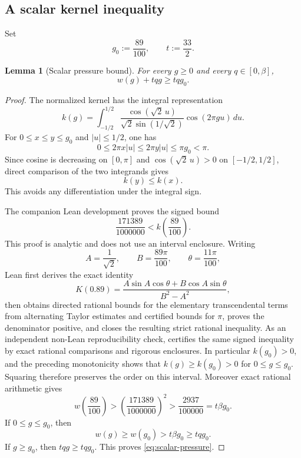 \documentclass[11pt]{article}
\newtheorem{lemma}[theorem]{Lemma}
\begin{document}
\subsection{A scalar kernel inequality}

Set
\begin{equation}\label{eq:g0t}
 g_0:=\frac{89}{100},
 \qquad
 t:=\frac{33}{2}.
\end{equation}

\begin{lemma}[Scalar pressure bound]\label{lem:scalar-pressure}
For every \(g\ge0\) and every \(q\in[0,\beta]\),
\begin{equation}\label{eq:scalar-pressure}
 w(g)+tqg\ge tqg_0.
\end{equation}
\end{lemma}

\begin{proof}
The normalized kernel has the integral representation
\[
 k(g)
 =
 \int_{-1/2}^{1/2}
 \frac{\cos(\sqrt2\,u)}
      {\sqrt2\sin(1/\sqrt2)}
 \cos(2\pi gu)\,du .
\]
For \(0\le x\le y\le g_0\) and \(|u|\le1/2\), one has
\[
 0\le2\pi x|u|\le2\pi y|u|\le\pi g_0<\pi.
\]
Since cosine is decreasing on \([0,\pi]\) and
\(\cos(\sqrt2\,u)>0\) on \([-1/2,1/2]\), direct comparison of the two
integrands gives
\[
 k(y)\le k(x).
\]
This avoids any differentiation under the integral sign.

The companion Lean development proves the signed
bound
\begin{equation}\label{eq:k089-signed}
 \frac{171389}{1000000}
 <
 k\!\left(\frac{89}{100}\right).
\end{equation}
This proof is analytic and does not use an interval enclosure.  Writing
\[
 A=\frac1{\sqrt2},\qquad B=\frac{89\pi}{100},\qquad
 \theta=\frac{11\pi}{100},
\]
Lean first derives the exact identity
\[
 K(0.89)=
 \frac{A\sin A\cos\theta+B\cos A\sin\theta}{B^2-A^2},
\]
then obtains directed rational bounds for the elementary transcendental terms
from alternating Taylor estimates and certified bounds for \(\pi\), proves the
denominator positive, and closes the resulting strict rational inequality.
As an independent non-Lean reproducibility check,
 certifies the same signed inequality by
exact rational comparisons and rigorous enclosures.
In particular \(k(g_0)>0\), and the preceding monotonicity shows that
\(k(g)\ge k(g_0)>0\) for \(0\le g\le g_0\).  Squaring therefore preserves the
order on this interval.  Moreover exact rational arithmetic gives
\begin{equation}\label{eq:w089}
 w\!\left(\frac{89}{100}\right)
 >
 \left(\frac{171389}{1000000}\right)^2
 >
 \frac{2937}{100000}
 =
 t\beta g_0.
\end{equation}
If \(0\le g\le g_0\), then
\[
 w(g)\ge w(g_0)>t\beta g_0\ge tqg_0.
\]
If \(g\ge g_0\), then \(tqg\ge tqg_0\).  This proves
\eqref{eq:scalar-pressure}.
\end{proof}
\end{document}
